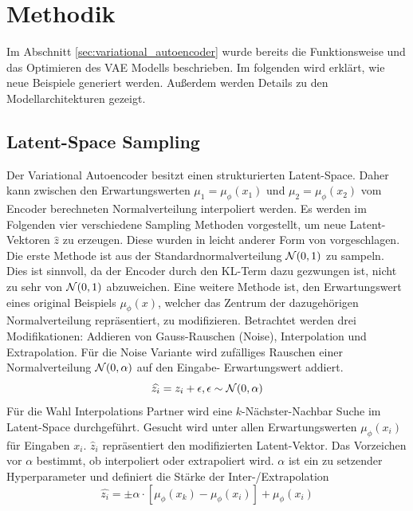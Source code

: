 \chapter{Methodik}
Im Abschnitt \ref{sec:variational_autoencoder} wurde bereits die Funktionsweise und das Optimieren des VAE Modells beschrieben. Im folgenden wird erklärt, wie neue Beispiele generiert werden. Außerdem werden Details zu den Modellarchitekturen gezeigt.



\section{Latent-Space Sampling}\label{sec:sampling}
Der Variational Autoencoder besitzt einen strukturierten Latent-Space. Daher kann zwischen den Erwartungswerten $\mu_1 = \mu_\phi(x_1)$ und $\mu_2 = \mu_\phi(x_2)$ vom Encoder berechneten Normalverteilung interpoliert werden. Es werden im Folgenden vier verschiedene Sampling Methoden vorgestellt, um neue Latent-Vektoren $\hat{z}$ zu erzeugen. Diese wurden in leicht anderer Form von \cite{Jorge2018} vorgeschlagen. Die erste Methode ist aus der Standardnormalverteilung $\mathcal{N}(0, 1)$ zu sampeln. Dies ist sinnvoll, da der Encoder durch den KL-Term dazu gezwungen ist, nicht zu sehr von $\mathcal{N}(0, 1)$ abzuweichen. Eine weitere Methode ist, den Erwartungswert eines original Beispiels $\mu_\phi(x)$, welcher das Zentrum der dazugehörigen Normalverteilung repräsentiert, zu modifizieren. Betrachtet werden drei Modifikationen: Addieren von Gauss-Rauschen (Noise), Interpolation und Extrapolation. Für die Noise Variante wird zufälliges Rauschen einer Normalverteilung $\mathcal{N}(0, \alpha)$ auf den Eingabe- Erwartungswert addiert.
\begin{equation}\label{eq:add_noise}
  \widehat{z_i} = z_i + \epsilon, \epsilon \sim \mathcal{N}(0, \alpha)
\end{equation}
Für die Wahl Interpolations Partner wird eine $k$-Nächster-Nachbar Suche im Latent-Space durchgeführt. Gesucht wird unter allen Erwartungswerten $\mu_\phi(x_i)$ für Eingaben $x_i$. $\hat{z}_i$ repräsentiert den modifizierten Latent-Vektor. Das Vorzeichen vor $\alpha$ bestimmt, ob interpoliert oder extrapoliert wird. $\alpha$ ist ein zu setzender Hyperparameter und definiert die Stärke der Inter-/Extrapolation
\begin{equation}
  \hat{z_i} = \pm \alpha \cdot \left[\mu_\phi(x_k) - \mu_\phi(x_i)\right] + \mu_\phi(x_i)
\end{equation}



